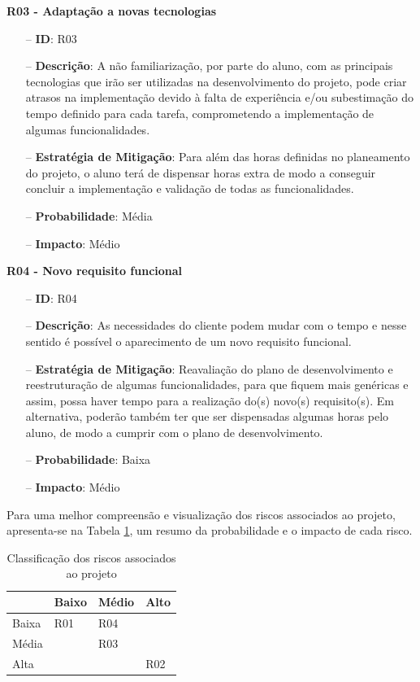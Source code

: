 \textbf{R03 - Adaptação a novas tecnologias }
\begin{itemize}
	\item[--] \textbf{ID}: R03
	\item[--] \textbf{Descrição}: A não familiarização, por parte do aluno, com as principais tecnologias que irão ser utilizadas na desenvolvimento do projeto, pode criar atrasos na implementação devido à falta de experiência e/ou subestimação do tempo definido para cada tarefa, comprometendo a implementação de algumas funcionalidades.
	\item[--] \textbf{Estratégia de Mitigação}: Para além das horas definidas no planeamento do projeto, o aluno terá de dispensar horas extra de modo a conseguir concluir a implementação e validação de todas as funcionalidades.
	\item[--] \textbf{Probabilidade}: Média
	\item[--] \textbf{Impacto}: Médio
\end{itemize}

\textbf{R04 - Novo requisito funcional}
\begin{itemize}
	\item[--] \textbf{ID}: R04
	\item[--] \textbf{Descrição}: As necessidades do cliente podem mudar com o tempo e nesse sentido é possível o aparecimento de um novo requisito funcional.
	\item[--] \textbf{Estratégia de Mitigação}: Reavaliação do plano de desenvolvimento e reestruturação de algumas funcionalidades, para que fiquem mais genéricas e assim, possa haver tempo para a realização do(s) novo(s) requisito(s). Em alternativa, poderão também ter que ser dispensadas algumas horas pelo aluno, de modo a cumprir com o plano de desenvolvimento.
	\item[--] \textbf{Probabilidade}: Baixa 
	\item[--] \textbf{Impacto}: Médio
\end{itemize}

Para uma melhor compreensão e visualização dos riscos associados ao projeto, apresenta-se na Tabela \ref{tab:riscos}, um resumo da probabilidade e o impacto de cada risco.

\begin{table}[ht!]
	\centering
	\begin{tabular}{ | l | l | l | l |}
		\hline
		\diagbox[width=15em]{Impacto}{Probabilidade}
		& Baixo & Médio & Alto\\
		\hline
		Baixa & \cellcolor{green}\centering R01 & \cellcolor{yellow}R04& \cellcolor{orange}\\
		\hline
		Média & \cellcolor{yellow} & \cellcolor{orange}R03 & \cellcolor{darkOrange}\\
		\hline
		Alta & \cellcolor{orange} & \cellcolor{darkOrange} & \cellcolor{red}R02\\
		\hline
	\end{tabular}
	\begin{center}
		\caption {Classificação dos riscos associados ao projeto}
		\label {tab:riscos}
	\end{center}
\end{table}



